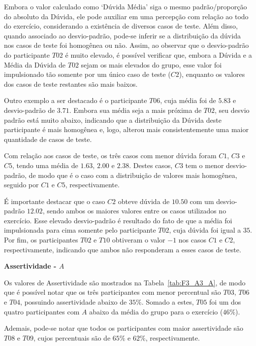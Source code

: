 Embora o valor calculado como `Dúvida Média' siga o mesmo padrão/proporção do absoluto da Dúvida, ele pode auxiliar em uma percepção com relação ao todo do exercício, considerando a existência de diversos casos de teste. Além disso, quando associado ao desvio-padrão, pode-se inferir se a distribuição da dúvida nos casos de teste foi homogênea ou não. Assim, ao observar que o desvio-padrão do participante $T02$ é muito elevado, é possível verificar que, embora a Dúvida e a Média da Dúvida de $T02$ sejam os mais elevados do grupo, esse valor foi impulsionado tão somente por um único caso de teste ($C2$), enquanto os valores dos casos de teste restantes são mais baixos.

Outro exemplo a ser destacado é o participante $T06$, cuja média foi de $5.83$ e desvio-padrão de $3.71$. Embora sua média seja a mais próxima de $T02$, seu desvio padrão está muito abaixo, indicando que a distribuição da Dúvida deste participante é mais homogênea e, logo, alterou mais consistentemente uma maior quantidade de casos de teste.

Com relação aos casos de teste, os três casos com menor dúvida foram $C1$, $C3$ e $C5$, tendo uma média de $1.63$, $2.00$ e $2.38$. Destes casos, $C3$ tem o menor desvio-padrão, de modo que é o caso com a distribuição de valores mais homogênea, seguido por $C1$ e $C5$, respectivamente.

É importante destacar que o caso $C2$ obteve dúvida de $10.50$ com um desvio-padrão $12.02$, sendo ambos os maiores valores entre os casos utilizados no exercício. Esse elevado desvio-padrão é resultado do fato de que a média foi impulsionada para cima somente pelo participante $T02$, cuja dúvida foi igual a $35$. Por fim, os participantes $T02$ e $T10$ obtiveram o valor $-1$ nos casos $C1$ e $C2$, respectivamente, indicando que ambos não responderam a esses casos de teste.

\textbf{Assertividade - $A$}

Os valores de Assertividade são mostrados na Tabela~\ref{tab:F3_A3_A}, de modo que é possível notar que os três participantes com menor percentual são $T03$, $T06$ e $T04$, possuindo assertividade abaixo de $35\%$. Somado a estes, $T05$ foi um dos quatro participantes com $A$ abaixo da média do grupo para o exercício ($46\%$).

Ademais, pode-se notar que todos os participantes com maior assertividade são $T08$ e $T09$, cujos percentuais são de $65\%$ e $62\%$, respectivamente.


